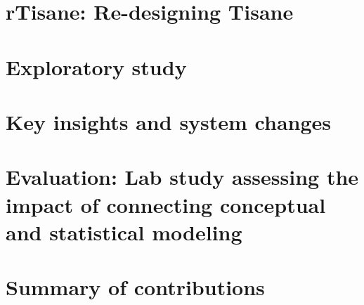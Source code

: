\section{rTisane: Re-designing Tisane}
\section{Exploratory study}
\section{Key insights and system changes}
\section{Evaluation: Lab study assessing the impact of connecting conceptual and statistical modeling}
\section{Summary of contributions}